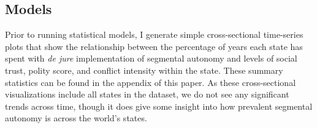 \documentclass[12pt]{article}
\begin{document}
\begin{table}[ht]
	\centering
	\setlength{\tabcolsep}{4pt}
	\renewcommand{\arraystretch}{1.5} 
	\caption{Pearson's Correlation of Segmental Autonomy and Authority Measurements}
\end{table}

\subsection{Models}
Prior to running statistical models, I generate simple cross-sectional time-series plots that show the relationship between the percentage of years each state has spent with \textit{de jure} implementation of segmental autonomy and levels of social trust, polity score, and conflict intensity within the state. These summary statistics can be found in the appendix of this paper. As these cross-sectional visualizations include all states in the dataset, we do not see any significant trends across time, though it does give some insight into how prevalent segmental autonomy is across the world's states. 
\end{document}
